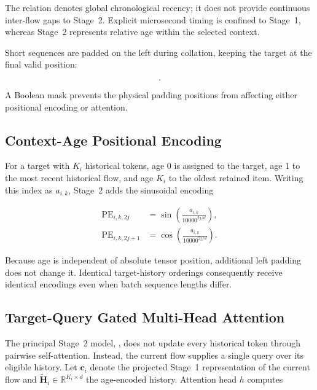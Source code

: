 \documentclass[11pt,fleqn]{report}
\begin{document}
The  relation denotes global chronological recency; it does not provide continuous inter-flow gaps to Stage~2. Explicit microsecond timing is confined to Stage~1, whereas Stage~2 represents relative age within the selected context.

Short sequences are padded on the left during collation, keeping the target at the final valid position:

\begin{equation}
    [\mathrm{PAD},\ldots,\mathrm{PAD},
      \mathbf{z}^{(1)}_{j_1},\ldots,
      \mathbf{z}^{(1)}_{j_{K_i}},
      \mathbf{z}^{(1)}_i].
    \label{eq:left_padded_context}
\end{equation}

A Boolean mask prevents the physical padding positions from affecting either positional encoding or attention.

\subsection{Context-Age Positional Encoding}
\label{subsubsec:context_age_encoding}

For a target with $K_i$ historical tokens, age 0 is assigned to the target, age 1 to the most recent historical flow, and age $K_i$ to the oldest retained item. Writing this index as $a_{i,k}$, Stage~2 adds the sinusoidal encoding

\begin{align}
    \operatorname{PE}_{i,k,2j}
    &=\sin\left(
        \frac{a_{i,k}}{10000^{2j/d}}
      \right),\\
    \operatorname{PE}_{i,k,2j+1}
    &=\cos\left(
        \frac{a_{i,k}}{10000^{2j/d}}
      \right).
    \label{eq:stage2_age_encoding}
\end{align}

Because age is independent of absolute tensor position, additional left padding does not change it. Identical target-history orderings consequently receive identical encodings even when batch sequence lengths differ.

\subsection{Target-Query Gated Multi-Head Attention}
\label{subsubsec:target_query_attention}

The principal Stage~2 model, , does not update every historical token through pairwise self-attention. Instead, the current flow supplies a single query over its eligible history. Let $\mathbf{c}_i$ denote the projected Stage~1 representation of the current flow and $\widetilde{\mathbf{H}}_i\in\mathbb{R}^{K_i\times d}$ the age-encoded history. Attention head $h$ computes
\end{document}
